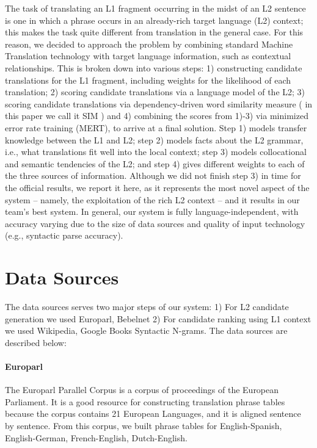 \documentclass[11pt]{article}
\begin{document}
The task of translating an L1 fragment occurring in the midst of an L2 sentence is one in which a phrase occurs in an already-rich target language (L2) context; this makes the task quite different from translation in the general case. For this reason, we decided to approach the problem by combining standard Machine Translation technology with target language information,
such as contextual relationships. 
This is broken down into various steps: 1) constructing candidate translations for the L1 fragment, including weights for the likelihood of each translation; 2) scoring candidate translations via a language model of the L2; 3) scoring candidate translations via dependency-driven word similarity measure \cite{lin:98} ( in this paper we call it SIM )
and 4) combining the scores from 1)-3) via minimized error rate training (MERT), to arrive at a final solution.  Step 1) models transfer knowledge between the L1 and L2; step 2) models facts about the L2 grammar, i.e., what translations fit well into the local context; step 3) models collocational and semantic tendencies of the L2; and step 4)  gives different weights to each of the three sources of information.  Although we did not finish step 3) in time for the official results, we report it here, as it represents the most novel aspect of the system -- namely, the exploitation of the rich L2 context -- and it results in our team's best system.  In general, our system is fully language-independent, with accuracy varying due to the size of data sources and quality of input technology (e.g., syntactic parse accuracy).

\section{Data Sources}
The data sources serves two major steps of our system: 1) For L2 candidate generation we used Europarl, Bebelnet 2) For candidate ranking using L1 context we used Wikipedia, Google Books Syntactic N-grams. The data sources are described below:\\

\paragraph{Europarl}  %
The Europarl Parallel Corpus is a corpus of proceedings of the European Parliament. It is a good resource for constructing translation phrase tables because the corpus contains 21 European Languages, and it is aligned sentence by sentence. From this corpus, we built phrase tables for English-Spanish, English-German, French-English, Dutch-English.\\
\end{document}
